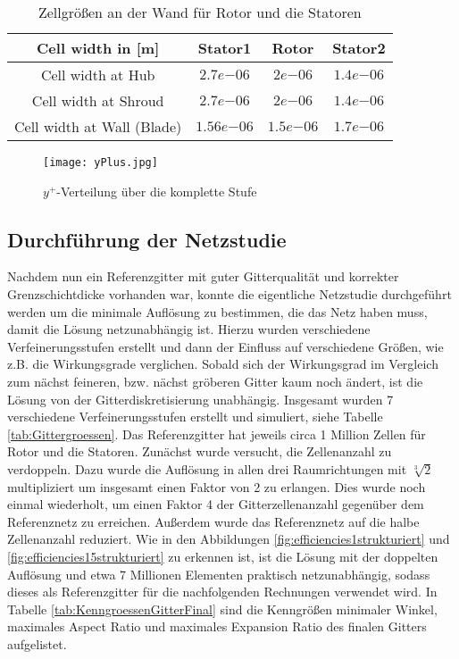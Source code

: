 \begin{table}[H]
\centering
\begin{tabular}[t]{cccc}
\toprule
 Cell width in [m] & Stator1 & Rotor & Stator2  \\
\midrule
Cell width at Hub & $2.7e{-06}$ & $2e{-06}$ & $1.4e{-06}$\\
Cell width at Shroud & $2.7e{-06}$ & $2e{-06}$ & $1.4e{-06}$ \\
Cell width at Wall (Blade) & $1.56e{-06}$ & $1.5e{-06}$ & $1.7e{-06}$ \\
\bottomrule
\end{tabular}
\caption{Zellgrößen an der Wand für Rotor und die Statoren} \label{cellWidths}
\end{table}

\begin{figure}[H]
	\centering
    
	\texttt{[image: yPlus.jpg]}
	\caption{$y^+$-Verteilung über die komplette Stufe} \label{imgYplusWerte}
\end{figure}

\subsection{Durchführung der Netzstudie}

Nachdem nun ein Referenzgitter mit guter Gitterqualität und korrekter Grenzschichtdicke vorhanden war, konnte die eigentliche Netzstudie durchgeführt werden um die minimale Auflösung zu bestimmen, die das Netz haben muss, damit die Lösung netzunabhängig ist. Hierzu wurden verschiedene Verfeinerungsstufen erstellt und dann der Einfluss auf verschiedene Größen, wie z.B. die Wirkungsgrade verglichen. Sobald sich der Wirkungsgrad im Vergleich zum nächst feineren, bzw. nächst gröberen Gitter kaum noch ändert, ist die Lösung von der Gitterdiskretisierung unabhängig. 
Insgesamt wurden 7 verschiedene Verfeinerungsstufen erstellt und simuliert, siehe Tabelle \ref{tab:Gittergroessen}. Das Referenzgitter hat jeweils circa 1 Million Zellen für Rotor und die Statoren. Zunächst wurde versucht, die Zellenanzahl zu verdoppeln. Dazu wurde die Auflösung in allen drei Raumrichtungen mit $\sqrt[3]{2}$ multipliziert um insgesamt einen Faktor von 2 zu erlangen. Dies wurde noch einmal wiederholt, um einen Faktor 4 der Gitterzellenanzahl gegenüber dem Referenznetz zu erreichen. Außerdem wurde das Referenznetz auf die halbe Zellenanzahl reduziert. Wie in den Abbildungen \ref{fig:efficiencies1strukturiert} und  \ref{fig:efficiencies15strukturiert} zu erkennen ist, ist die Lösung mit der doppelten Auflösung und etwa 7 Millionen Elementen praktisch netzunabhängig, sodass dieses als Referenzgitter für die nachfolgenden Rechnungen verwendet wird. 
In Tabelle \ref{tab:KenngroessenGitterFinal}  sind die Kenngrößen minimaler Winkel, maximales Aspect Ratio und maximales Expansion Ratio des finalen Gitters aufgelistet.

